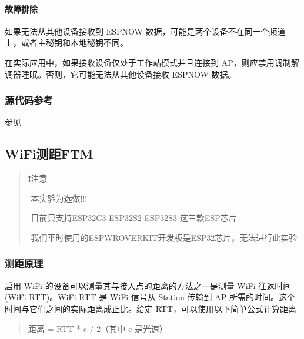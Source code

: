 \documentclass[a4paper,12pt,english]{sphinxmanual}
\begin{document}
{{\paragraph{故障排除}
\label{\detokenize{exp-esp32/wifi/esp-now:id12}}
\sphinxAtStartPar
如果无法从其他设备接收到 ESP\sphinxhyphen{}NOW 数据，可能是两个设备不在同一个频道上，或者主秘钥和本地秘钥不同。

\sphinxAtStartPar
在实际应用中，如果接收设备仅处于工作站模式并且连接到 AP，则应禁用调制解调器睡眠。否则，它可能无法从其他设备接收 ESP\sphinxhyphen{}NOW 数据。


\subsubsection{源代码参考}
\label{\detokenize{exp-esp32/wifi/esp-now:id13}}
\sphinxAtStartPar
参见{\hyperref[\detokenize{reference::doc}]{}}

\sphinxstepscope


\subsection{WiFi测距FTM}
\label{\detokenize{exp-esp32/wifi/ftm:wififtm}}\label{\detokenize{exp-esp32/wifi/ftm::doc}}\begin{quote}

\sphinxAtStartPar
❗注意

\sphinxAtStartPar
​	本实验为选做!!!

\sphinxAtStartPar
​	目前只支持ESP32\sphinxhyphen{}C3	ESP32\sphinxhyphen{}S2	ESP32\sphinxhyphen{}S3 这三款ESP芯片

\sphinxAtStartPar
​	我们平时使用的ESP\sphinxhyphen{}WROVER\sphinxhyphen{}KIT开发板是ESP32芯片，无法进行此实验
\end{quote}


\subsubsection{测距原理}
\label{\detokenize{exp-esp32/wifi/ftm:id1}}
\sphinxAtStartPar
启用 WiFi 的设备可以测量其与接入点的距离的方法之一是测量 Wi\sphinxhyphen{}Fi 往返时间 (Wi\sphinxhyphen{}Fi RTT)。Wi\sphinxhyphen{}Fi RTT 是 WiFi 信号从 Station 传输到 AP 所需的时间。这个时间与它们之间的实际距离成正比。给定 RTT，可以使用以下简单公式计算距离
\begin{quote}

\sphinxAtStartPar
距离 = RTT * c / 2（其中 c 是光速）
\end{quote}

}}
\end{document}
